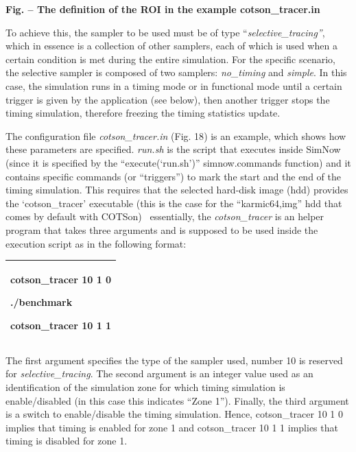 \documentclass[a4paper]{article}
\newcounter{Figure}
\renewcommand\theFigure{\arabic{Figure}}
\begin{document}
{\centering{}\sffamily\bfseries
\label{bkm:Ref388197251}Fig.
\stepcounter{Figure}{\theFigure} -- The definition of the ROI in the
example cotson\_tracer.in
\par}

{\ttfamily
\textrm{To achieve this, the sampler to be used must be of type
{\textquotedblleft}}\textrm{\textit{selective\_tracing{\textquotedblright}}}\textrm{,
which in essence is a collection of other samplers, each of which is
used when a certain condition is met during the entire simulation. For
the specific scenario, the selective sampler is composed of two
samplers: }\textrm{\textit{no\_timing}}\textrm{ and
}\textrm{\textit{simple}}\textrm{. In this case, the simulation runs in
a timing mode or in functional mode until a certain trigger is given by
the application (see below), then another trigger stops the timing
simulation, therefore freezing the timing statistics update. }}

{\ttfamily
\textrm{The configuration file
}\textrm{\textit{cotson\_tracer.in}}\textrm{ (}\textrm{Fig.
18}\textrm{) is an example, which shows how these parameters are
specified. }\textrm{\textit{run.sh}}\textrm{ is the script that
executes inside SimNow (since it is specified by the
{\textquotedblleft}execute({\textquoteleft}run.sh{\textquoteright}){\textquotedblright}
simnow.commands function) and it contains specific commands (or
{\textquotedblleft}triggers{\textquotedblright}) to mark the start and
the end of the timing simulation. This requires that the selected
hard-disk image (hdd) provides the
{\textquoteleft}cotson\_tracer{\textquoteright} executable (this is the
case for the {\textquotedblleft}karmic64,img{\textquotedblright} hdd
that comes by default with COTSon) \ essentially, the
}\textrm{\textit{cotson\_tracer}}\textrm{ is an helper program that
takes three arguments and is supposed to be used inside the execution
script as in the following format:}}

\begin{flushleft}
\tablehead{}
\begin{supertabular}{|m{6.21846in}|}
\hline
{\ttfamily
cotson\_tracer 10 1 0}

{\ttfamily
./benchmark}

\ttfamily
cotson\_tracer 10 1 1\\\hline
\end{supertabular}
\end{flushleft}
{
The first argument specifies the type of the sampler used, number 10 is
reserved for \textit{selective\_tracing}. The second argument is an
integer value used as an identification of the simulation zone for
which timing simulation is enable/disabled (in this case this indicates
{\textquotedblleft}Zone 1{\textquotedblright}). Finally, the third
argument is a switch to enable/disable the timing simulation. Hence,
cotson\_tracer 10 1 0 implies that timing is enabled for zone 1 and
cotson\_tracer 10 1 1 implies that timing is disabled for zone 1.}
\end{document}
